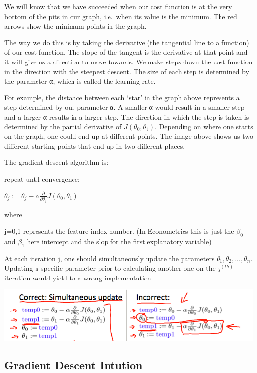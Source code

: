 \documentclass[
]{article}
\begin{document}
We will know that we have succeeded when our cost function is at the
very bottom of the pits in our graph, i.e.~when its value is the
minimum. The red arrows show the minimum points in the graph.

The way we do this is by taking the derivative (the tangential line to a
function) of our cost function. The slope of the tangent is the
derivative at that point and it will give us a direction to move
towards. We make steps down the cost function in the direction with the
steepest descent. The size of each step is determined by the parameter
α, which is called the learning rate.

For example, the distance between each `star' in the graph above
represents a step determined by our parameter α. A smaller α would
result in a smaller step and a larger α results in a larger step. The
direction in which the step is taken is determined by the partial
derivative of \(J(\theta_0,\theta_1)\). Depending on where one starts on
the graph, one could end up at different points. The image above shows
us two different starting points that end up in two different places.

The gradient descent algorithm is:

repeat until convergence:

\(\theta_j := \theta_j - \alpha \frac{\partial}{\partial \theta_j} J(\theta_0, \theta_1)\)

where

j=0,1 represents the feature index number. (In Econometrics this is just
the \(\beta_0\) and \(\beta_1\) here intercept and the slop for the
first explanatory variable)

At each iteration j, one should simultaneously update the parameters
\(\theta_1, \theta_2,...,\theta_n\). Updating a specific parameter prior
to calculating another one on the \(j^{(th)}\) iteration would yield to
a wrong implementation.

\includegraphics{Gradient_descent_graph_2.png}

\hypertarget{gradient-descent-intution}{%
\subsection{Gradient Descent Intution}\label{gradient-descent-intution}}
\end{document}
